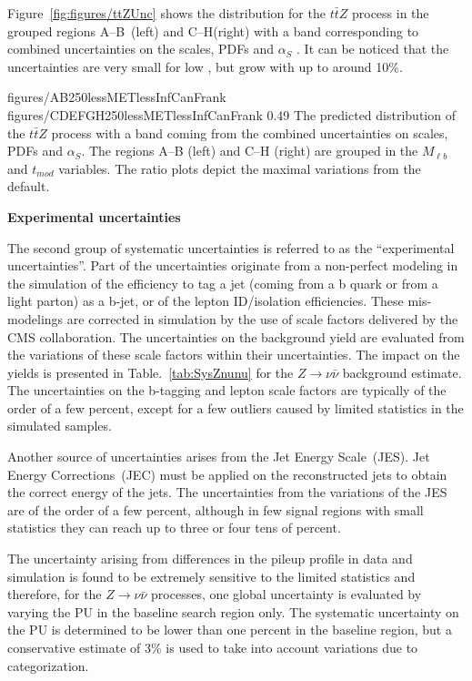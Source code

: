 Figure~\ref{fig:figures/ttZUnc} shows the  \MET distribution for the $t\bar{t}Z$ process in the grouped regions A--B~(left) and C--H(right) with a band corresponding to combined uncertainties on the scales, PDFs and $\alpha_{S}$ . It can be noticed that the uncertainties are very small for low \MET, but grow with \MET up to around 10\%.

                 {figures/AB250lessMETlessInfCanFrank} %
                 {figures/CDEFGH250lessMETlessInfCanFrank} %
                 {0.49}       %
                 { The predicted \MET distribution of the $t\bar{t}Z$ process with a band coming from the combined uncertainties on scales, PDFs and $\alpha_{S}$. The regions A--B (left) and C--H (right) are grouped in the $M_{\ell b}$ and $t_{mod}$ variables. The ratio plots depict the maximal variations from the default. }

\textbf{Experimental uncertainties}

The second group of systematic uncertainties is referred to as the ``experimental uncertainties''. Part of the uncertainties originate from a non-perfect modeling in the simulation of the efficiency to tag a jet (coming from a b quark or from a light parton) as a b-jet, or of the lepton ID/isolation efficiencies. These mis-modelings are corrected in simulation by the use of scale factors delivered by the CMS collaboration.  The uncertainties on the background yield are evaluated from the variations of these scale factors within their uncertainties. The impact on the yields is presented in Table.~\ref{tab:SysZnunu} for the $Z \to \nu \bar{\nu}$ background estimate. The uncertainties on the b-tagging and lepton scale factors are typically of the order of a few percent, except for a few outliers caused by limited statistics in the simulated samples.

Another source of uncertainties arises from the Jet Energy Scale~(JES). Jet Energy Corrections~(JEC) must be applied on the reconstructed jets to obtain the correct energy of the jets. The uncertainties from the variations of the JES are of the order of a few percent, although in few signal regions with small statistics they can reach up to three or four tens of percent. 

The uncertainty arising from differences in the pileup profile in data and simulation is found to be extremely sensitive to the limited statistics and therefore, for the $Z \to  \nu \bar{\nu}$ processes, one global uncertainty is evaluated by varying the PU in the baseline search region only. The systematic uncertainty on the PU is determined to be lower than one percent in the baseline region, but a conservative estimate of 3\% is used to take into account variations due to categorization. 

